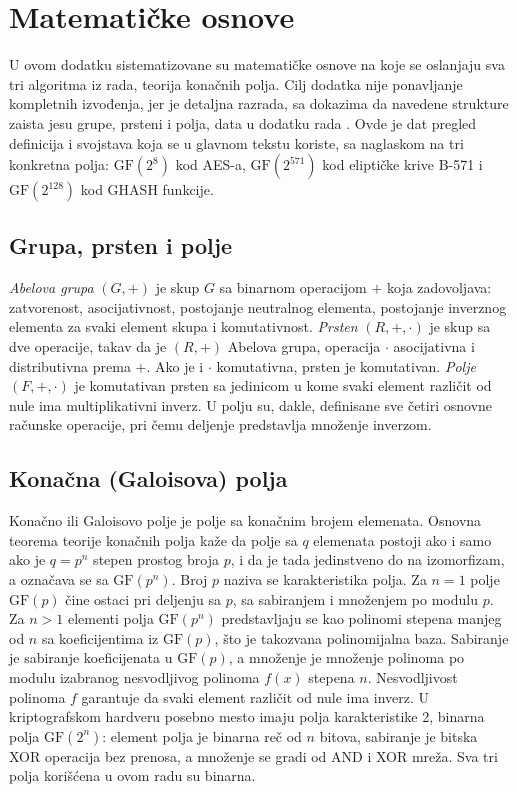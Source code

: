 \chapter{Matematičke osnove}
\label{app:math}

U ovom dodatku sistematizovane su matematičke osnove na koje se oslanjaju sva tri algoritma iz rada, teorija konačnih polja. Cilj dodatka nije ponavljanje kompletnih izvođenja, jer je detaljna razrada, sa dokazima da navedene strukture zaista jesu grupe, prsteni i polja, data u dodatku rada \cite{gavrilovic_diplomski}. Ovde je dat pregled definicija i svojstava koja se u glavnom tekstu koriste, sa naglaskom na tri konkretna polja: $\mathrm{GF}(2^8)$ kod AES-a, $\mathrm{GF}(2^{571})$ kod eliptičke krive B-571 i $\mathrm{GF}(2^{128})$ kod GHASH funkcije.

\section{Grupa, prsten i polje}
\label{app:strukture}

\textit{Abelova grupa} $(G, +)$ je skup $G$ sa binarnom operacijom $+$ koja zadovoljava: zatvorenost, asocijativnost, postojanje neutralnog elementa, postojanje inverznog elementa za svaki element skupa i komutativnost.
\smallbreak
\textit{Prsten} $(R, +, \cdot)$ je skup sa dve operacije, takav da je $(R, +)$ Abelova grupa, operacija $\cdot$ asocijativna i distributivna prema $+$. Ako je i $\cdot$ komutativna, prsten je komutativan.
\smallbreak
\textit{Polje} $(F, +, \cdot)$ je komutativan prsten sa jedinicom u kome svaki element različit od nule ima multiplikativni inverz. U polju su, dakle, definisane sve četiri osnovne računske operacije, pri čemu deljenje predstavlja množenje inverzom.

\section{Konačna (Galoisova) polja}
\label{app:konacna_polja}

Konačno ili Galoisovo polje je polje sa konačnim brojem elemenata. Osnovna teorema teorije konačnih polja kaže da polje sa $q$ elemenata postoji ako i samo ako je $q = p^n$ stepen prostog broja $p$, i da je tada jedinstveno do na izomorfizam, a označava se sa $\mathrm{GF}(p^n)$. Broj $p$ naziva se karakteristika polja.
\smallbreak
Za $n=1$ polje $\mathrm{GF}(p)$ čine ostaci pri deljenju sa $p$, sa sabiranjem i množenjem po modulu $p$. Za $n > 1$ elementi polja $\mathrm{GF}(p^n)$ predstavljaju se kao polinomi stepena manjeg od $n$ sa koeficijentima iz $\mathrm{GF}(p)$, što je takozvana polinomijalna baza. Sabiranje je sabiranje koeficijenata u $\mathrm{GF}(p)$, a množenje je množenje polinoma po modulu izabranog nesvodljivog polinoma $f(x)$ stepena $n$. Nesvodljivost polinoma $f$ garantuje da svaki element različit od nule ima inverz.
\smallbreak
U kriptografskom hardveru posebno mesto imaju polja karakteristike 2, binarna polja $\mathrm{GF}(2^n)$: element polja je binarna reč od $n$ bitova, sabiranje je bitska XOR operacija bez prenosa, a množenje se gradi od AND i XOR mreža. Sva tri polja korišćena u ovom radu su binarna.

